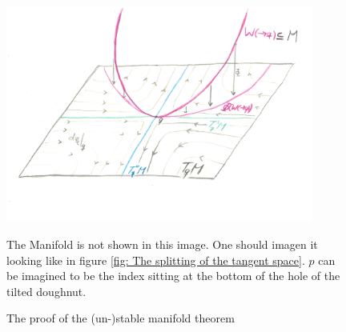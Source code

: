\begin{figure}
	\centering
	\includegraphics[width=0.9\textwidth]{Text/Pictures/Unstable Manifold/proof stable mfd thm.pdf}
	\caption{The proof of the (un-)stable manifold theorem}
	The Manifold is not shown in this image. One should imagen it looking like in figure \ref{fig: The splitting of the tangent space}. $p$ can be imagined to be the index sitting at the bottom of the hole of the tilted doughnut. 
	\label{fig: The proof of the (un-)stable manifold theorem}
\end{figure}

